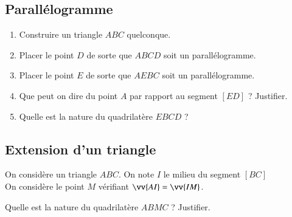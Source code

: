 \documentclass[oneside,12pt]{article}          %
\begin{document}
\subsection{Parallélogramme}
\begin{enumerate}
	\item Construire un triangle $ABC$ quelconque.
	\item Placer le point $D$ de sorte que $ABCD$ soit un parallélogramme.
	\item Placer le point $E$ de sorte que $AEBC$ soit un parallélogramme.
	\item Que peut on dire du point $A$ par rapport au segment $[ED]$ ? Justifier.
	\item Quelle est la nature du quadrilatère $EBCD$ ?
\end{enumerate}



\subsection{Extension d'un triangle}
On considère un triangle $ABC$. On note $I$ le milieu du segment $[BC]$ \\
On considère le point $M$ vérifiant $\vv{AI}=\vv{IM}$. 

Quelle est la nature du quadrilatère $ABMC$ ? Justifier.
\end{document}

